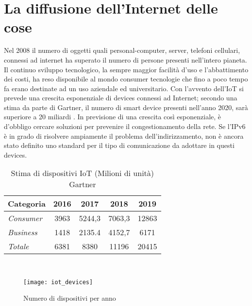 \section{La diffusione dell'Internet delle cose}
Nel 2008 il numero di oggetti quali personal-computer, server, telefoni cellulari,
connessi ad internet ha superato il numero di persone presenti nell'intero
pianeta. Il continuo sviluppo tecnologico, la sempre maggior facilità d'uso e
l'abbattimento dei costi, ha reso disponibile al mondo consumer tecnologie che
fino a poco tempo fa erano destinate ad un uso aziendale ed universitario. 
Con l'avvento dell'IoT si prevede una crescita esponenziale di devices connessi
ad Internet;  secondo  una stima da parte di Gartner, il numero di smart
device presenti nell'anno 2020, sarà superiore a 20 miliardi \cite{gartner2016}.
In previsione di una crescita così esponenziale, è d'obbligo cercare soluzioni
per prevenire il congestionamento della rete. Se l'IPv6 è in grado di risolvere
ampiamente il problema dell'indirizzamento, non è ancora stato definito uno
standard per il tipo di comunicazione da adottare in questi devices.
\\
\begin{table}[h]
        \centering
        \begin{tabular}{l|c|c|c|c}
                \textbf{Categoria}  & 2016 & 2017 & 2018 & 2019 \\
                \hline
                \emph{Consumer}  & 3963 & 5244,3 & 7063,3 & 12863 \\
                \emph{Business}  & 1418 & 2135.4 & 4152,7 & 6171  \\
                \emph{Totale }   & 6381 & 8380   & 11196  & 20415 \\
        \end{tabular}
        \caption{Stima di dispositivi IoT (Milioni di unità)
        Gartner\cite{gartner2016}}
\end{table}
\\
\begin{figure}[h]
        \centering 
                \texttt{[image: iot\_devices]}
        \caption{Numero di dispositivi per anno}
\end{figure}
